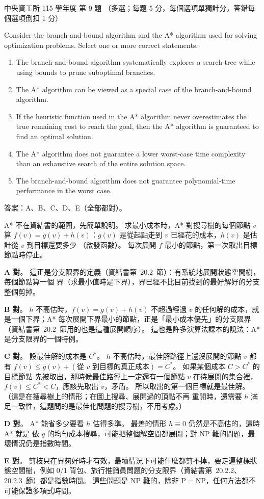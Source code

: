 \begin{pastexam}[label={px:ncu-115-dsa-09}]{中央資工所 115 學年度 第 9 題}
（多選；每題 5 分，每個選項單獨計分，答錯每個選項倒扣 1 分）

Consider the branch-and-bound algorithm and the A* algorithm used for solving optimization problems. Select one or more correct statements.
\begin{enumerate}[label=\Alph*.]
\item The branch-and-bound algorithm systematically explores a search tree while using bounds to prune suboptimal branches.
\item The A* algorithm can be viewed as a special case of the branch-and-bound algorithm.
\item If the heuristic function used in the A* algorithm never overestimates the true remaining cost to reach the goal, then the A* algorithm is guaranteed to find an optimal solution.
\item The A* algorithm does not guarantee a lower worst-case time complexity than an exhaustive search of the entire solution space.
\item The branch-and-bound algorithm does not guarantee polynomial-time performance in the worst case.
\end{enumerate}
\end{pastexam}

\begin{pastsoln}
答案：A、B、C、D、E（全部都對）。

A* 不在資結書的範圍，先簡單說明。 求最小成本時，A* 對搜尋樹的每個節點 $v$ 算
$f(v) = g(v) + h(v)$：$g(v)$ 是從起點走到 $v$ 已經花的成本，$h(v)$ 是估計從 $v$ 到目標還要多少
（啟發函數）。 每次展開 $f$ 最小的節點，第一次取出目標節點時停止。

\textbf{A 對}。 這正是分支限界的定義（資結書第~20.2~節）：有系統地展開狀態空間樹，每個節點算一個
界（求最小值時是下界），界已經不比目前找到的最好解好的分支整個剪掉。

\textbf{B 對}。 $h$ 不高估時，$f(v) = g(v) + h(v)$ 不超過經過 $v$ 的任何解的成本，就是一個下界；A*
每次展開下界最小的節點，正是「最小成本優先」的分支限界（資結書第~20.2~節用的也是這種展開順序）。
這也是許多演算法課本的說法：A* 是分支限界的一個特例。

\textbf{C 對}。 設最佳解的成本是 $C^*$。 $h$ 不高估時，最佳解路徑上還沒展開的節點 $v$ 都有
$f(v) \le g(v) + (\text{從 } v \text{ 到目標的真正成本}) = C^*$。 如果某個成本 $C > C^*$ 的目標節點
先被取出，那時候最佳路徑上一定還有一個節點 $v$ 在待展開的集合裡，$f(v) \le C^* < C$，應該先取出
$v$，矛盾。 所以取出的第一個目標就是最佳解。 （這是在搜尋樹上的情形；在圖上搜尋、展開過的頂點不再
重開時，還需要 $h$ 滿足一致性，這題問的是最佳化問題的搜尋樹，不用考慮。）

\textbf{D 對}。 A* 能省多少要看 $h$ 估得多準。 最差的情形 $h \equiv 0$ 仍然是不高估的，這時 A* 就是
依 $g$ 的均勻成本搜尋，可能把整個解空間都展開；對 NP 難的問題，最壞情況仍是指數時間。

\textbf{E 對}。 剪枝只在界夠好時才有效，最壞情況下可能什麼都剪不掉，要走遍整棵狀態空間樹，例如
0/1 背包、旅行推銷員問題的分支限界（資結書第~20.2.2、20.2.3~節）都是指數時間。 這些問題是 NP
難的，除非 $\mathrm{P} = \mathrm{NP}$，任何方法都不可能保證多項式時間。
\end{pastsoln}
